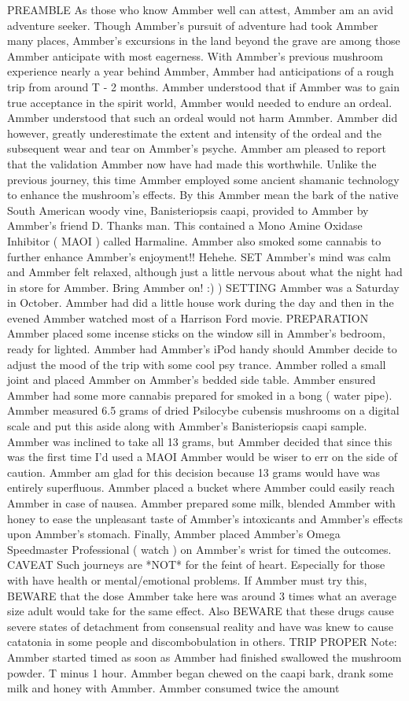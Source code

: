 \documentclass[12pt]{book}
\begin{document}
PREAMBLE As those who know Ammber well can attest, Ammber am an avid adventure seeker. Though Ammber's pursuit of adventure had took Ammber many places, Ammber's excursions in the land beyond the grave are among those Ammber anticipate with most eagerness. With Ammber's previous mushroom experience nearly a year behind Ammber, Ammber had anticipations of a rough trip from around T - 2 months. Ammber understood that if Ammber was to gain true acceptance in the spirit world, Ammber would needed to endure an ordeal. Ammber understood that such an ordeal would not harm Ammber. Ammber did however, greatly underestimate the extent and intensity of the ordeal and the subsequent wear and tear on Ammber's psyche. Ammber am pleased to report that the validation Ammber now have had made this worthwhile. Unlike the previous journey, this time Ammber employed some ancient shamanic technology to enhance the mushroom's effects. By this Ammber mean the bark of the native South American woody vine, Banisteriopsis caapi, provided to Ammber by Ammber's friend D. Thanks man. This contained a Mono Amine Oxidase Inhibitor ( MAOI ) called Harmaline. Ammber also smoked some cannabis to further enhance Ammber's enjoyment!! Hehehe. SET Ammber's mind was calm and Ammber felt relaxed, although just a little nervous about what the night had in store for Ammber. Bring Ammber on! :) ) SETTING Ammber was a Saturday in October. Ammber had did a little house work during the day and then in the evened Ammber watched most of a Harrison Ford movie. PREPARATION Ammber placed some incense sticks on the window sill in Ammber's bedroom, ready for lighted. Ammber had Ammber's iPod handy should Ammber decide to adjust the mood of the trip with some cool psy trance. Ammber rolled a small joint and placed Ammber on Ammber's bedded side table. Ammber ensured Ammber had some more cannabis prepared for smoked in a bong ( water pipe). Ammber measured 6.5 grams of dried Psilocybe cubensis mushrooms on a digital scale and put this aside along with Ammber's Banisteriopsis caapi sample. Ammber was inclined to take all 13 grams, but Ammber decided that since this was the first time I'd used a MAOI Ammber would be wiser to err on the side of caution. Ammber am glad for this decision because 13 grams would have was entirely superfluous. Ammber placed a bucket where Ammber could easily reach Ammber in case of nausea. Ammber prepared some milk, blended Ammber with honey to ease the unpleasant taste of Ammber's intoxicants and Ammber's effects upon Ammber's stomach. Finally, Ammber placed Ammber's Omega Speedmaster Professional ( watch ) on Ammber's wrist for timed the outcomes. CAVEAT Such journeys are *NOT* for the feint of heart. Especially for those with have health or mental/emotional problems. If Ammber must try this, BEWARE that the dose Ammber take here was around 3 times what an average size adult would take for the same effect. Also BEWARE that these drugs cause severe states of detachment from consensual reality and have was knew to cause catatonia in some people and discombobulation in others. TRIP PROPER Note: Ammber started timed as soon as Ammber had finished swallowed the mushroom powder. T minus 1 hour. Ammber began chewed on the caapi bark, drank some milk and honey with Ammber. Ammber consumed twice the amount 
\end{document}
